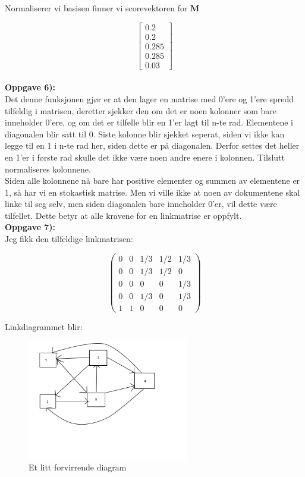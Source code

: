 \documentclass[a4paper,norsk,11pt,twoside]{article}
\begin{document}
Normaliserer vi basisen finner vi scorevektoren for \textbf{M}

$$
\begin{bmatrix}
0.2 \\ 0.2 \\ 0.285 \\ 0.285 \\ 0.03
\end{bmatrix}
$$\\

\textbf{Oppgave 6):}\\

Det denne funksjonen gjør er at den lager en matrise med 0'ere og 1'ere spredd tilfeldig i matrisen, deretter sjekker den om det er noen kolonner som bare inneholder 0'ere, og om det er tilfelle blir en 1'er lagt til n-te rad. Elementene i diagonalen blir satt til 0. Siste kolonne blir sjekket seperat, siden vi ikke kan legge til en 1 i n-te rad her, siden dette er på diagonalen. Derfor settes det heller en 1'er i første rad skulle det ikke være noen andre enere i kolonnen. Tilslutt normaliseres kolonnene. \\

Siden alle kolonnene nå bare har positive elementer og summen av elementene er 1, så har vi en stokastisk matrise. Men vi ville ikke at noen av dokumentene skal linke til seg selv, men siden diagonalen bare inneholder 0'er, vil dette være tilfellet. Dette betyr at alle kravene for en linkmatrise er oppfylt.\\


\textbf{Oppgave 7):}\\

Jeg fikk den tilfeldige linkmatrisen:

$$
\begin{pmatrix}
0 & 0 & 1/3 & 1/2 & 1/3 \\
0 & 0 & 1/3 & 1/2 & 0 \\
0 & 0 & 0 & 0 & 1/3 \\
0 & 0 & 1/3 & 0 & 1/3 \\
1 & 1 & 0 & 0 & 0
\end{pmatrix}
$$ 

Linkdiagrammet blir:

\begin{figure}[hbt]
\begin{center}
\includegraphics[width=70mm]{linkdiagram.png}
\caption{Et litt forvirrende diagram}\label{fig:finfigur}
\end{center}
\end{figure} 
\end{document}
